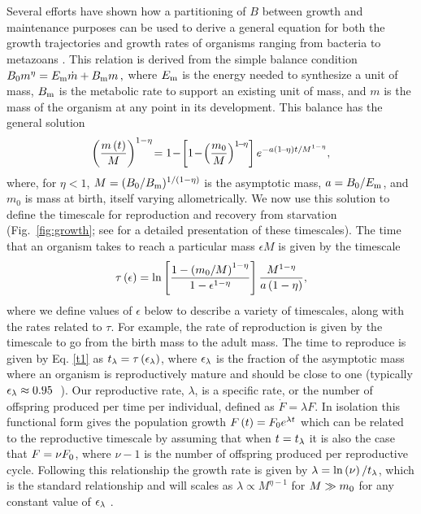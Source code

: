 \documentclass[twocolumn,preprintnumbers,amsmath,amssymb,superscriptaddress]{revtex4}
\begin{document}
{Several efforts have shown how a partitioning of $B$ between growth and
maintenance purposes can be used to derive a general equation for both the
growth trajectories and growth rates of organisms ranging from bacteria to
metazoans
\citep{West:2001bv,moses2008rmo,gillooly2002esa,hou,Savage:2004ed,Kempes:2012hy}. This relation is derived from the simple balance condition 
$B_{\rm 0}m^{\eta}=E_{\rm m}\dot{m}+B_{\rm m}m\,,$
\citep{West:2001bv,moses2008rmo,gillooly2002esa,hou,Savage:2004ed,Kempes:2012hy} where $E_{\rm m}$ is the energy needed to synthesize a unit of mass, $B_{\rm m}$ is
the metabolic rate to support an existing unit of mass, and $m$ is the mass
of the organism at any point in its development.  This balance has the
general solution \citep{bettencourt,Kempes:2012hy}
\begin{eqnarray}
\label{m1}
\left(\frac{m\left(t\right)}{M}\right)^{1-\eta}\!=1\!-\!\left[1\!-\!\left(\frac{m_{\rm 0}}{M}\right)^{1\!-\!\eta}\right]e^{-a\left(1\!-\!\eta\right)t/M^{1-\eta}},
\end{eqnarray}
where, for $\eta<1$, $M=(B_{\rm 0}/B_{\rm m})^{1/(1-\eta)}$ is the asymptotic mass,
$a=B_{\rm 0}/E_{\rm m}$, and $m_0$ is mass at birth, itself varying allometrically.  We now use this solution to define the timescale for
reproduction and recovery from starvation (Fig.~\ref{fig:growth}; see
\citep{moses2008rmo} for a detailed presentation of these timescales). The
time that an organism takes to reach a particular mass $\epsilon M$ is given
by the timescale
\begin{equation}
\label{t1}
\tau\left(\epsilon\right) = \ln\left[\frac{1-\left(m_{\rm 0}/M\right)^{1-\eta}}{1-\epsilon^{1-\eta}}\right]\frac{M^{1-\eta}}{a\left(1-\eta\right)},
\end{equation}
where we define values of $\epsilon$ below to describe a variety of
timescales, along with the rates related to $\tau$.  For example, the rate of
reproduction is given by the timescale to go from the birth mass to the adult
mass. The time to reproduce is given by Eq. \ref{t1} as
$t_{\rm \lambda}=\tau\left(\epsilon_{\rm \lambda}\right)$, where $\epsilon_{\rm \lambda}$
is the fraction of the asymptotic mass where an organism is reproductively
mature and should be close to one (typically
$\epsilon_{\rm \lambda}\approx0.95\;$ \citep{West:2001bv}). Our reproductive
rate, $\lambda$, is a specific rate, or the number of offspring produced per
time per individual, defined as $\dot{F} = \lambda F$. In isolation this
functional form gives the population growth
$F\left(t\right) = F_{\rm 0}e^{\lambda t}$ which can be related to the
reproductive timescale by assuming that when $t=t_{\rm \lambda}$ it is also the
case that $F=\nu F_{\rm 0}$, where $\nu-1$ is the number of offspring produced
per reproductive cycle. Following this relationship the growth rate is given
by $\lambda=\ln\left(\nu\right)/t_{\rm \lambda}$, which is the standard
relationship \citep{Savage:2004ed} and will scales as
$\lambda\propto M^{\eta-1}$ for $M\gg m_{\rm 0}$ for any constant value of
$\epsilon_{\rm \lambda}$
\citep{West:2001bv,moses2008rmo,gillooly2002esa,hou,Kempes:2012hy}.


}
\end{document}
